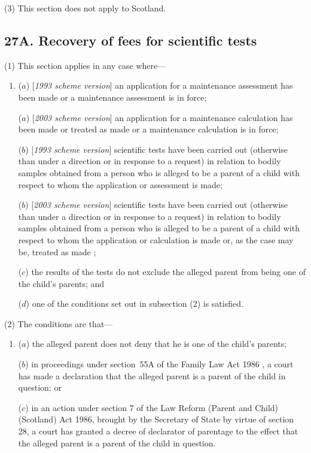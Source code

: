 \documentclass[12pt,a4paper]{article}
\begin{document}
(3) This section does not apply to Scotland.


\subsection{27A. Recovery of fees for scientific tests}

(1) This section applies in any case where—
\begin{enumerate}\item[]
($a$) [\emph{1993 scheme version}] an application for a maintenance assessment has been made or a maintenance assessment is in force;

($a$) [\emph{2003 scheme version}] an application for a 
maintenance calculation  %
has been made 
or treated as made  %
or a 
maintenance calculation  %
is in force;

($b$) [\emph{1993 scheme version}] scientific tests have been carried out (otherwise than under a direction or in response to a request) in relation to bodily samples obtained from a person who is alleged to be a parent of a child with respect to whom the application or assessment is made;

($b$) [\emph{2003 scheme version}] scientific tests have been carried out (otherwise than under a direction or in response to a request) in relation to bodily samples obtained from a person who is alleged to be a parent of a child with respect to whom the application or 
calculation  %
is made
or, as the case may be, treated as made%
;

($c$) the results of the tests do not exclude the alleged parent from being one of the child’s parents; and

($d$) one of the conditions set out in subsection (2) is satisfied.
\end{enumerate}

(2) The conditions are that—
\begin{enumerate}\item[]
($a$) the alleged parent does not deny that he is one of the child’s parents;

($b$) in proceedings under 
section~55A of the Family Law Act 1986%
, a court has made a declaration that the alleged parent is a parent of the child in question; or

($c$) in an action under section 7 of the Law Reform (Parent and Child) (Scotland) Act 1986, brought by the Secretary of State by virtue of section 28, a court has granted a decree of declarator of parentage to the effect that the alleged parent is a parent of the child in question.
\end{enumerate}
\end{document}
